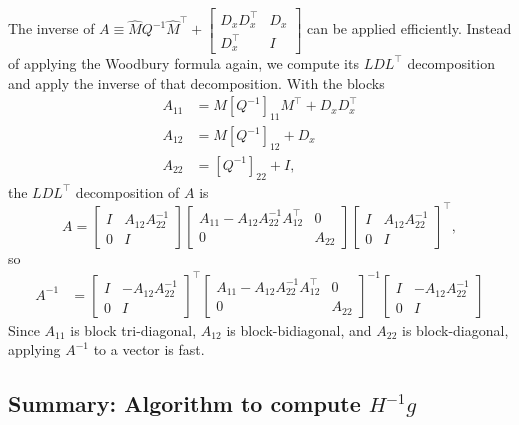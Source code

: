 \documentclass{article}
\begin{document}
The inverse of $A\equiv \hat{M} Q^{-1} \hat{M}^\top +
\begin{bmatrix}
  D_x D_x^\top & D_x \\ D_x^\top & I
\end{bmatrix}
$ can be applied efficiently. Instead of applying the Woodbury formula again, we compute its $LDL^\top$ decomposition and apply the inverse of that decomposition.
With the blocks
\begin{align}
  A_{11} & = M \left[Q^{-1}\right]_{11} M^\top +D_x D_x^\top \nonumber \\
  A_{12} & = M\left[Q^{-1}\right]_{12} + D_x \nonumber                 \\
  A_{22} & = \left[Q^{-1}\right]_{22} + I,
\end{align}
the $LDL^\top$ decomposition of $A$ is
\begin{equation}
  A       =
  \begin{bmatrix}
    I & A_{12} A_{22}^{-1} \\ 0 & I
  \end{bmatrix}
  \begin{bmatrix}
    A_{11} - A_{12} A_{22}^{-1} A_{12}^\top & 0      \\
    0                                       & A_{22}
  \end{bmatrix}
  \begin{bmatrix}
    I & A_{12} A_{22}^{-1} \\ 0 & I
  \end{bmatrix}
  ^\top,
\end{equation}
so
\begin{align}
  A^{-1} & =
  \begin{bmatrix}
    I & -A_{12} A_{22}^{-1} \\ 0 & I
  \end{bmatrix}
  ^\top
  \begin{bmatrix}
    A_{11} - A_{12} A_{22}^{-1} A_{12}^\top & 0      \\
    0                                       & A_{22}
  \end{bmatrix}
  ^{-1}
  \begin{bmatrix}
    I & -A_{12} A_{22}^{-1} \\ 0 & I
  \end{bmatrix}
\end{align}
Since $A_{11}$ is block tri-diagonal, $A_{12}$ is block-bidiagonal, and $A_{22}$ is block-diagonal, applying $A^{-1}$ to a vector is fast.

\subsection*{Summary: Algorithm to compute $H^{-1} g$}
\end{document}
